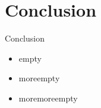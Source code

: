 \section{Conclusion}
\begin{frame}{Conclusion}

	\begin{minipage}[c][4cm]{\textwidth}
		\begin{itemize}
			\itemfill
			\item empty
			\item moreempty
			\item moremoreempty
		\end{itemize}
	\end{minipage}
	
\end{frame}
